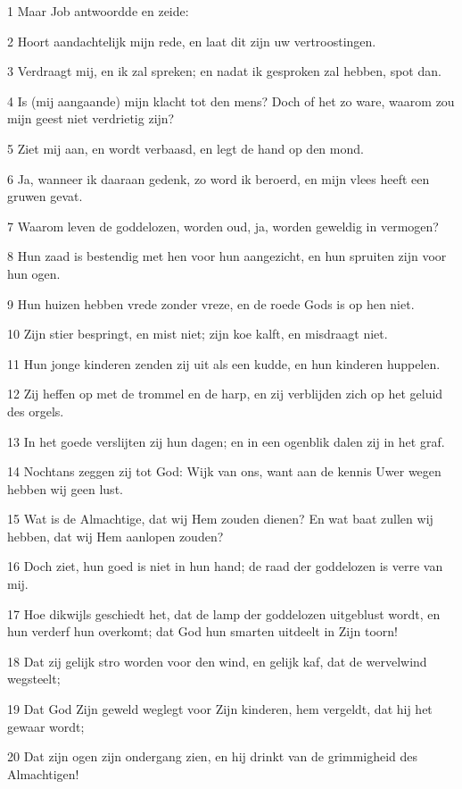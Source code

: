 \par 1 Maar Job antwoordde en zeide:
\par 2 Hoort aandachtelijk mijn rede, en laat dit zijn uw vertroostingen.
\par 3 Verdraagt mij, en ik zal spreken; en nadat ik gesproken zal hebben, spot dan.
\par 4 Is (mij aangaande) mijn klacht tot den mens? Doch of het zo ware, waarom zou mijn geest niet verdrietig zijn?
\par 5 Ziet mij aan, en wordt verbaasd, en legt de hand op den mond.
\par 6 Ja, wanneer ik daaraan gedenk, zo word ik beroerd, en mijn vlees heeft een gruwen gevat.
\par 7 Waarom leven de goddelozen, worden oud, ja, worden geweldig in vermogen?
\par 8 Hun zaad is bestendig met hen voor hun aangezicht, en hun spruiten zijn voor hun ogen.
\par 9 Hun huizen hebben vrede zonder vreze, en de roede Gods is op hen niet.
\par 10 Zijn stier bespringt, en mist niet; zijn koe kalft, en misdraagt niet.
\par 11 Hun jonge kinderen zenden zij uit als een kudde, en hun kinderen huppelen.
\par 12 Zij heffen op met de trommel en de harp, en zij verblijden zich op het geluid des orgels.
\par 13 In het goede verslijten zij hun dagen; en in een ogenblik dalen zij in het graf.
\par 14 Nochtans zeggen zij tot God: Wijk van ons, want aan de kennis Uwer wegen hebben wij geen lust.
\par 15 Wat is de Almachtige, dat wij Hem zouden dienen? En wat baat zullen wij hebben, dat wij Hem aanlopen zouden?
\par 16 Doch ziet, hun goed is niet in hun hand; de raad der goddelozen is verre van mij.
\par 17 Hoe dikwijls geschiedt het, dat de lamp der goddelozen uitgeblust wordt, en hun verderf hun overkomt; dat God hun smarten uitdeelt in Zijn toorn!
\par 18 Dat zij gelijk stro worden voor den wind, en gelijk kaf, dat de wervelwind wegsteelt;
\par 19 Dat God Zijn geweld weglegt voor Zijn kinderen, hem vergeldt, dat hij het gewaar wordt;
\par 20 Dat zijn ogen zijn ondergang zien, en hij drinkt van de grimmigheid des Almachtigen!
